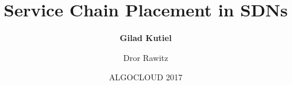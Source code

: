 \title{Service Chain Placement in SDNs}
\author[shortname]{
    \textbf{Gilad Kutiel}  \and Dror Rawitz 
}
\date{ALGOCLOUD 2017}
